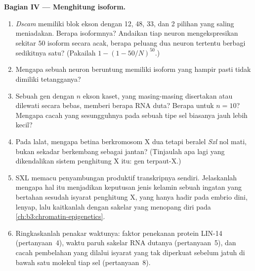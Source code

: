 \begin{problem}
\medskip
\noindent\textbf{Bagian IV --- Menghitung isoform.}
\begin{enumerate}[resume]
  \item \emph{Dscam} memiliki blok ekson dengan 12, 48, 33, dan 2 pilihan
        yang saling meniadakan. Berapa isoformnya? Andaikan tiap neuron
        mengekspresikan sekitar $50$ isoform secara acak, berapa peluang
        dua neuron tertentu berbagi sedikitnya satu? (Pakailah $1 - (1 -
        50/N)^{50}$.)
  \item Mengapa sebuah neuron beruntung memiliki isoform yang hampir pasti
        tidak dimiliki tetangganya?
  \item Sebuah gen dengan $n$ ekson kaset, yang masing-masing disertakan
        atau dilewati secara bebas, memberi berapa RNA duta? Berapa untuk
        $n = 10$? Mengapa cacah yang sesungguhnya pada sebuah tipe sel
        biasanya jauh lebih kecil?
  \item Pada lalat, mengapa betina berkromosom X dua tetapi beralel
        \emph{Sxl} nol mati, bukan sekadar berkembang sebagai
        jantan? (Tinjaulah apa lagi yang dikendalikan sistem penghitung X
        itu:  gen terpaut-X.)
  \item SXL memacu penyambungan produktif transkripnya sendiri.
        Jelaskanlah mengapa hal itu menjadikan keputusan jenis kelamin
        sebuah ingatan yang bertahan sesudah isyarat penghitung X, yang
        hanya hadir pada embrio dini, lenyap, lalu kaitkanlah dengan
        sakelar yang menopang diri pada
        \cref{ch:b3:chromatin-epigenetics}.
  \item Ringkaskanlah penakar waktunya: faktor penekanan protein LIN-14
        (pertanyaan~4), waktu paruh sakelar RNA dutanya
        (pertanyaan~5), dan cacah pembelahan yang dilalui isyarat yang tak
        diperkuat sebelum jatuh di bawah satu molekul tiap sel
        (pertanyaan~8).
\end{enumerate}
\end{problem}
